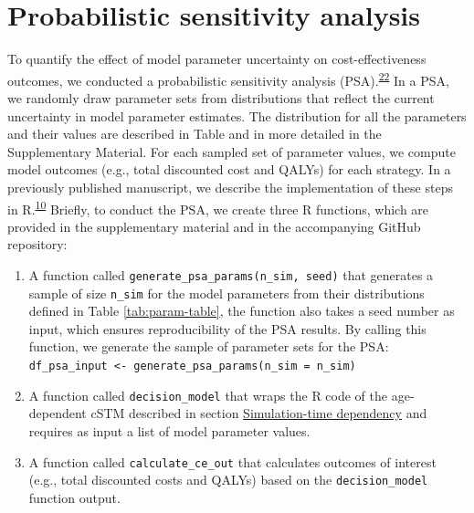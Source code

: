 \documentclass[
]{article}
\providecommand{\tightlist}{%
  \setlength{\itemsep}{0pt}\setlength{\parskip}{0pt}}
\begin{document}
\hypertarget{probabilistic-sensitivity-analysis}{%
\section{Probabilistic sensitivity analysis}\label{probabilistic-sensitivity-analysis}}

To quantify the effect of model parameter uncertainty on cost-effectiveness outcomes, we conducted a probabilistic sensitivity analysis (PSA).\textsuperscript{\protect\hyperlink{ref-Briggs2012}{22}} In a PSA, we randomly draw parameter sets from distributions that reflect the current uncertainty in model parameter estimates. The distribution for all the parameters and their values are described in Table and in more detailed in the Supplementary Material. For each sampled set of parameter values, we compute model outcomes (e.g., total discounted cost and QALYs) for each strategy. In a previously published manuscript, we describe the implementation of these steps in R.\textsuperscript{\protect\hyperlink{ref-Alarid-Escudero2019e}{10}} Briefly, to conduct the PSA, we create three R functions, which are provided in the supplementary material and in the accompanying GitHub repository:

\begin{enumerate}
\def\labelenumi{\arabic{enumi}.}
\tightlist
\item
  A function called \texttt{generate\_psa\_params(n\_sim,\ seed)} that generates a sample of size \texttt{n\_sim} for the model parameters from their distributions defined in Table \ref{tab:param-table}, the function also takes a seed number as input, which ensures reproducibility of the PSA results. By calling this function, we generate the sample of parameter sets for the PSA: \texttt{df\_psa\_input\ \textless{}-\ generate\_psa\_params(n\_sim\ =\ n\_sim)}
\item
  A function called \texttt{decision\_model} that wraps the R code of the age-dependent cSTM described in section \protect\hyperlink{simulation-time-dependency}{Simulation-time dependency} and requires as input a list of model parameter values.
\item
  A function called \texttt{calculate\_ce\_out} that calculates outcomes of interest (e.g., total discounted costs and QALYs) based on the \texttt{decision\_model} function output.
\end{enumerate}
\end{document}
